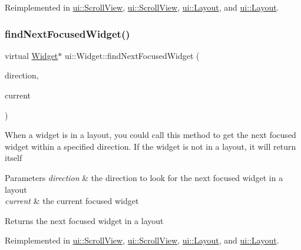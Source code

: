 Reimplemented in \hyperlink{classui_1_1ScrollView_adda46d15b5742af6e64a96b23c3ca10a}{ui\+::\+Scroll\+View}, \hyperlink{classui_1_1ScrollView_adda46d15b5742af6e64a96b23c3ca10a}{ui\+::\+Scroll\+View}, \hyperlink{classui_1_1Layout_ae19c0e9a2c478634667f1241db1df0c4}{ui\+::\+Layout}, and \hyperlink{classui_1_1Layout_a49f3db931bff292e279ddd65dcd3fe6f}{ui\+::\+Layout}.

\mbox{\label{classui_1_1Widget_aa50c26d9c13f00bada9f14f01a0bfbe4}} 
\subsubsection{\texorpdfstring{find\+Next\+Focused\+Widget()}{findNextFocusedWidget()}\hspace{0.1cm}{\footnotesize\ttfamily [2/2]}}
{\footnotesize\ttfamily virtual \hyperlink{classui_1_1Widget}{Widget}$\ast$ ui\+::\+Widget\+::find\+Next\+Focused\+Widget (\begin{DoxyParamCaption}\item[{\hyperlink{classui_1_1Widget_a8ae8e8fc793a04a87584205cd1e8a8a5}{Focus\+Direction}}]{direction,  }\item[{\hyperlink{classui_1_1Widget}{Widget} $\ast$}]{current }\end{DoxyParamCaption})\hspace{0.3cm}{\ttfamily [virtual]}}

When a widget is in a layout, you could call this method to get the next focused widget within a specified direction. If the widget is not in a layout, it will return itself 
\begin{DoxyParams}{Parameters}
{\em direction} & the direction to look for the next focused widget in a layout \\
\hline
{\em current} & the current focused widget \\
\hline
\end{DoxyParams}
\begin{DoxyReturn}{Returns}
the next focused widget in a layout 
\end{DoxyReturn}


Reimplemented in \hyperlink{classui_1_1ScrollView_adda46d15b5742af6e64a96b23c3ca10a}{ui\+::\+Scroll\+View}, \hyperlink{classui_1_1ScrollView_adda46d15b5742af6e64a96b23c3ca10a}{ui\+::\+Scroll\+View}, \hyperlink{classui_1_1Layout_ae19c0e9a2c478634667f1241db1df0c4}{ui\+::\+Layout}, and \hyperlink{classui_1_1Layout_a49f3db931bff292e279ddd65dcd3fe6f}{ui\+::\+Layout}.

